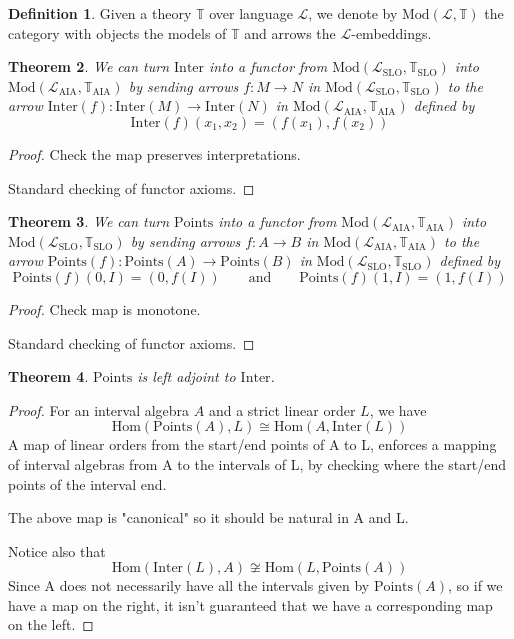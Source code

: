 \documentclass[11pt %
              ]{article}
\newcommand{\lang}{\mathcal{L}}
\newcommand{\theory}{\mathbb{T}}
\newcommand{\laia}{\lang_\text{AIA}}
\newcommand{\taia}{\theory_\text{AIA}}
\newcommand{\inter}[1]{\text{Inter}\left(#1\right)}
\newcommand{\points}[1]{\text{Points}\left(#1\right)}
\newcommand{\lslo}{\lang_\text{SLO}}
\newcommand{\tslo}{\theory_\text{SLO}}
\theoremstyle{plain}
\newtheorem{thm}{Theorem}%
\theoremstyle{definition}
\newtheorem{defn}[thm]{Definition}
\theoremstyle{remark}
\begin{document}

\begin{defn}
  Given a theory $\theory$ over language $\lang$, we denote by $\text{Mod}(\lang, \theory)$ the category
  with objects the models of $\theory$ and arrows the $\lang$-embeddings.
\end{defn}

\begin{thm}
  We can turn $\text{Inter}$ into a functor from $\text{Mod}(\lslo,\tslo)$ into
  $\text{Mod}(\laia,\taia)$ by sending arrows $f : M \to N$ in $\text{Mod}(\lslo,\tslo)$ to the arrow
  $\inter{f} : \inter{M} \to \inter{N}$ in $\text{Mod}(\laia,\taia)$ defined by
  \begin{equation*}
    \inter{f}(x_1, x_2) = (f(x_1), f(x_2))
  \end{equation*}
\end{thm}
\begin{proof}
  Check the map preserves interpretations.

  Standard checking of functor axioms.
\end{proof}

\begin{thm}
  We can turn $\text{Points}$ into a functor from $\text{Mod}(\laia,\taia)$ into
  $\text{Mod}(\lslo,\tslo)$ by sending arrows $f : A \to B$ in $\text{Mod}(\laia,\taia)$ to the arrow
  $\points{f} : \points{A} \to \points{B}$ in $\text{Mod}(\lslo,\tslo)$ defined by
  \begin{equation*}
    \points{f}(0, I) = (0, f(I)) \qquad\text{and}\qquad \points{f}(1,I) = (1, f(I))
  \end{equation*}
\end{thm}
\begin{proof}
  Check map is monotone.

  Standard checking of functor axioms.
\end{proof}

\begin{thm}
  $\text{Points}$ is left adjoint to $\text{Inter}$.
\end{thm}
\begin{proof}
  For an interval algebra $A$ and a strict linear order $L$, we have
  \begin{equation*}
    \text{Hom}(\points{A}, L) \cong \text{Hom}(A, \inter{L})
  \end{equation*}
  A map of linear orders from the start/end points of A to L, enforces a mapping of interval
  algebras from A to the intervals of L, by checking where the start/end points of the interval end.
 
  The above map is "canonical" so it should be natural in A and L.

  Notice also that
  \begin{equation*}
    \text{Hom}(\inter{L},A) \not\cong \text{Hom}(L, \points{A})
  \end{equation*}
  Since A does not necessarily have all the intervals given by $\points{A}$, so if we have a map on
  the right, it isn't guaranteed that we have a corresponding map on the left.
\end{proof}
\end{document}
